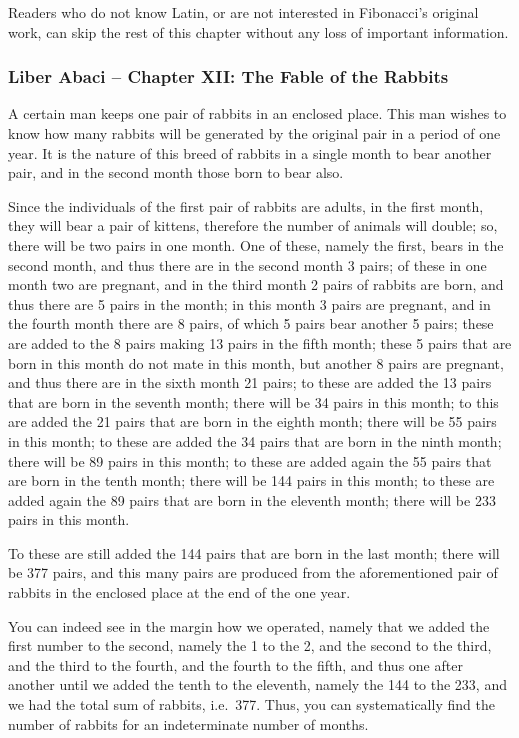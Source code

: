 \documentclass[
  12pt,
]{book}
\begin{document}
Readers who do not know Latin, or are not interested in Fibonacci's
original work, can skip the rest of this chapter without any loss of
important information.

\subsubsection*{Liber Abaci -- Chapter XII: The Fable of the
Rabbits}\label{LiberAbaci}

A certain man keeps one pair of rabbits in an enclosed place. This man
wishes to know how many rabbits will be generated by the original pair
in a period of one year. It is the nature of this breed of rabbits in a
single month to bear another pair, and in the second month those born to
bear also.

Since the individuals of the first pair of rabbits are adults, in the
first month, they will bear a pair of kittens, therefore the number of
animals will double; so, there will be two pairs in one month. One of
these, namely the first, bears in the second month, and thus there are
in the second month 3 pairs; of these in one month two are pregnant, and
in the third month 2 pairs of rabbits are born, and thus there are 5
pairs in the month; in this month 3 pairs are pregnant, and in the
fourth month there are 8 pairs, of which 5 pairs bear another 5 pairs;
these are added to the 8 pairs making 13 pairs in the fifth month; these
5 pairs that are born in this month do not mate in this month, but
another 8 pairs are pregnant, and thus there are in the sixth month 21
pairs; to these are added the 13 pairs that are born in the seventh
month; there will be 34 pairs in this month; to this are added the 21
pairs that are born in the eighth month; there will be 55 pairs in this
month; to these are added the 34 pairs that are born in the ninth month;
there will be 89 pairs in this month; to these are added again the 55
pairs that are born in the tenth month; there will be 144 pairs in this
month; to these are added again the 89 pairs that are born in the
eleventh month; there will be 233 pairs in this month.

To these are still added the 144 pairs that are born in the last month;
there will be 377 pairs, and this many pairs are produced from the
aforementioned pair of rabbits in the enclosed place at the end of the
one year.

You can indeed see in the margin how we operated, namely that we added
the first number to the second, namely the 1 to the 2, and the second to
the third, and the third to the fourth, and the fourth to the fifth, and
thus one after another until we added the tenth to the eleventh, namely
the 144 to the 233, and we had the total sum of rabbits, i.e.~377. Thus,
you can systematically find the number of rabbits for an indeterminate
number of months.
\end{document}
